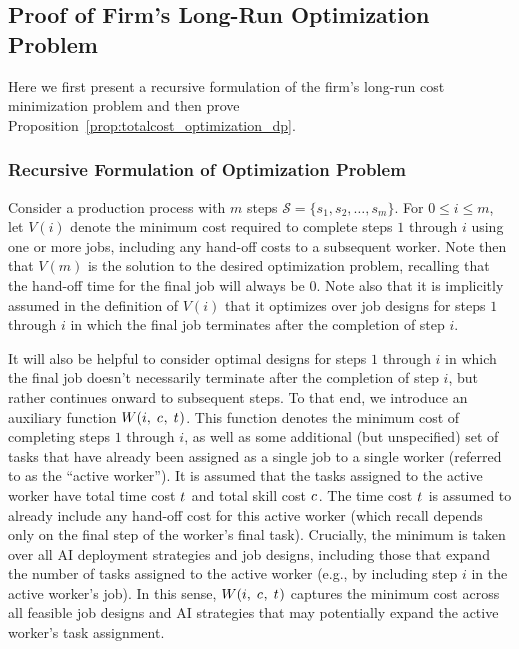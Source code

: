 \subsection{Proof of Firm's Long-Run Optimization Problem}
\label{app:long_run_optimization}

Here we first present a recursive formulation of the firm's long-run cost minimization problem and then prove Proposition~\ref{prop:totalcost_optimization_dp}.

\subsubsection{Recursive Formulation of Optimization Problem}
Consider a production process with $m$ steps $\mathcal{S} = \{s_1, s_2, \ldots, s_m\}$.
For $0 \leq i \leq m$, let $V(i)$ denote the minimum cost required to complete steps $1$ through $i$ using one or more jobs, including any hand-off costs to a subsequent worker.  
Note then that $V(m)$ is the solution to the desired optimization problem, recalling that the hand-off time for the final job will always be $0$.  
Note also that it is implicitly assumed in the definition of $V(i)$ that it optimizes over job designs for steps $1$ through $i$ in which the final job terminates after the completion of step $i$.

It will also be helpful to consider optimal designs for steps $1$ through $i$ in which the final job doesn't necessarily terminate after the completion of step $i$, but rather continues onward to subsequent steps.  
To that end, we introduce an auxiliary function $W(i,\; c_{},\; t_{})$.
This function denotes the minimum cost of completing steps $1$ through $i$, as well as some additional (but unspecified) set of tasks that have already been assigned as a single job to a single worker (referred to as the ``active worker'').  
It is assumed that the tasks assigned to the active worker have total time cost $t_{}$ and total skill cost $c_{}$.  
The time cost $t_{}$ is assumed to already include any hand-off cost for this active worker (which recall depends only on the final step of the worker's final task). 
Crucially, the minimum is taken over all AI deployment strategies and job designs, including those that expand the number of tasks assigned to the active worker (e.g., by including step $i$ in the active worker's job).
In this sense, $W(i,\; c_{},\; t_{})$ captures the minimum cost across all feasible job designs and AI strategies that may potentially expand the active worker's task assignment.

